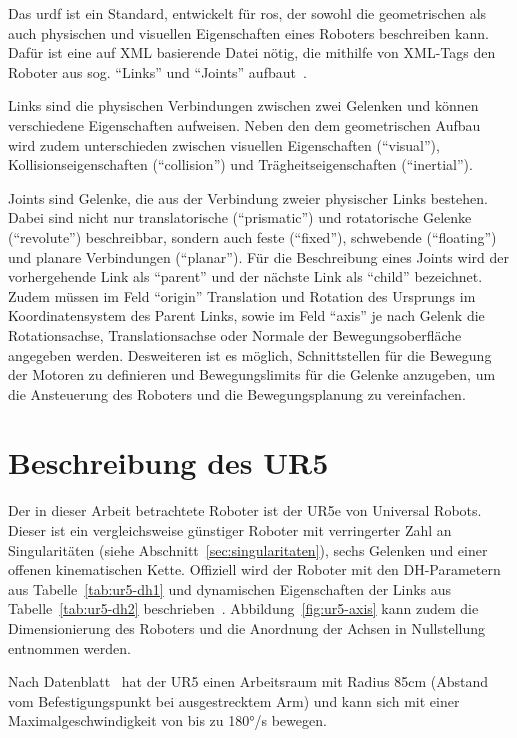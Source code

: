 Das \ac{urdf} ist ein Standard, entwickelt für \ac{ros}, der sowohl die geometrischen als auch physischen und visuellen Eigenschaften eines Roboters beschreiben kann.
Dafür ist eine auf XML basierende Datei nötig, die mithilfe von XML-Tags den Roboter aus sog. \enquote{Links} und \enquote{Joints} aufbaut~\cite{ros.orgUrdfXMLModel}.

Links sind die physischen Verbindungen zwischen zwei Gelenken und können verschiedene Eigenschaften aufweisen.
Neben den dem geometrischen Aufbau wird zudem unterschieden zwischen visuellen Eigenschaften (\enquote{visual}), Kollisionseigenschaften (\enquote{collision}) und Trägheitseigenschaften (\enquote{inertial}).

Joints sind Gelenke, die aus der Verbindung zweier physischer Links bestehen.
Dabei sind nicht nur translatorische (\enquote{prismatic}) und rotatorische Gelenke (\enquote{revolute}) beschreibbar, sondern auch feste (\enquote{fixed}), schwebende (\enquote{floating}) und planare Verbindungen (\enquote{planar}).
Für die Beschreibung eines Joints wird der vorhergehende Link als \enquote{parent} und der nächste Link als \enquote{child} bezeichnet.
Zudem müssen im Feld \enquote{origin} Translation und Rotation des Ursprungs im Koordinatensystem des Parent Links, sowie im Feld \enquote{axis} je nach Gelenk die Rotationsachse, Translationsachse oder Normale der Bewegungsoberfläche angegeben werden.
Desweiteren ist es möglich, Schnittstellen für die Bewegung der Motoren zu definieren und Bewegungslimits für die Gelenke anzugeben, um die Ansteuerung des Roboters und die Bewegungsplanung zu vereinfachen.

\section{Beschreibung des UR5}\label{sec:ur5-in-dh}
Der in dieser Arbeit betrachtete Roboter ist der UR5e von Universal Robots.
Dieser ist ein vergleichsweise günstiger Roboter mit verringerter Zahl an Singularitäten (siehe Abschnitt~\ref{sec:singularitaten}), sechs Gelenken und einer offenen kinematischen Kette.
Offiziell wird der Roboter mit den DH-Parametern aus Tabelle~\ref{tab:ur5-dh1} und dynamischen Eigenschaften der Links aus Tabelle~\ref{tab:ur5-dh2} beschrieben~\cite{universalrobotsUniversalRobotsDH}.
Abbildung~\ref{fig:ur5-axis} kann zudem die Dimensionierung des Roboters und die Anordnung der Achsen in Nullstellung entnommen werden.

Nach Datenblatt~\cite{universalrobotsUR5TechnicalSpecifications} hat der UR5 einen Arbeitsraum mit Radius 85cm (Abstand vom Befestigungspunkt bei ausgestrecktem Arm) und kann sich mit einer Maximalgeschwindigkeit von bis zu 180°/s bewegen.

